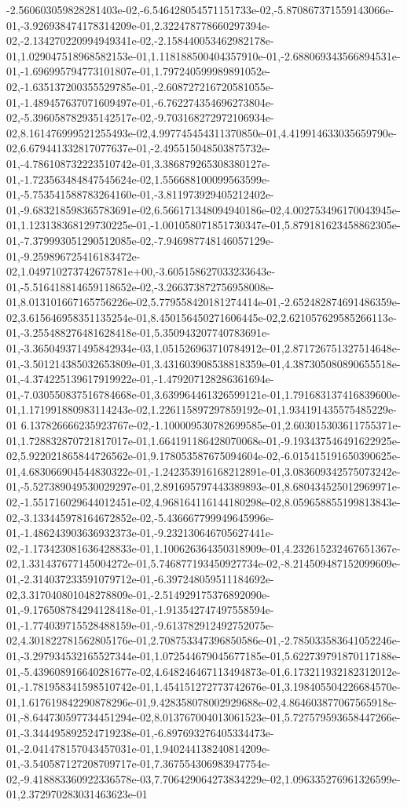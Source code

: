 -2.560603059828281403e-02,-6.546428054571151733e-02,-5.870867371559143066e-01,-3.926938474178314209e-01,2.322478778660297394e-02,-2.134270220994949341e-02,-2.158440053462982178e-01,1.029047518968582153e-01,1.118188500404357910e-01,-2.688069343566894531e-01,-1.696995794773101807e-01,1.797240599989891052e-02,-1.635137200355529785e-01,-2.608727216720581055e-01,-1.489457637071609497e-01,-6.762274354696273804e-02,-5.396058782935142517e-02,-9.703168272972106934e-02,8.161476999521255493e-02,4.997745454311370850e-01,4.419914633035659790e-02,6.679441332817077637e-01,-2.495515048503875732e-01,-4.786108732223510742e-01,3.386879265308380127e-01,-1.723563484847545624e-02,1.556688100099563599e-01,-5.753541588783264160e-01,-3.811973929405212402e-01,-9.683218598365783691e-02,6.566171348094940186e-02,4.002753496170043945e-01,1.123138368129730225e-01,-1.001058071851730347e-01,5.879181623458862305e-01,-7.379993051290512085e-02,-7.946987748146057129e-01,-9.259896725416183472e-02,1.049710273742675781e+00,-3.605158627033233643e-01,-5.516418814659118652e-02,-3.266373872756958008e-01,8.013101667165756226e-02,5.779558420181274414e-01,-2.652482874691486359e-02,3.615646958351135254e-01,8.450156450271606445e-02,2.621057629585266113e-01,-3.255488276481628418e-01,5.350943207740783691e-01,-3.365049371495842934e-03,1.051526963710784912e-01,2.871726751327514648e-01,-3.501214385032653809e-01,3.431603908538818359e-01,4.387305080890655518e-01,-4.374225139617919922e-01,-1.479207128286361694e-01,-7.030550837516784668e-01,3.639964461326599121e-01,1.791683137416839600e-01,1.171991880983114243e-02,1.226115897297859192e-01,1.934191435575485229e-01
6.137826666235923767e-02,-1.100009530782699585e-01,2.603015303611755371e-01,1.728832870721817017e-01,1.664191186428070068e-01,-9.193437546491622925e-02,5.922021865844726562e-01,9.178053587675094604e-02,-6.015415191650390625e-01,4.683066904544830322e-01,-1.242353916168212891e-01,3.083609342575073242e-01,-5.527389049530029297e-01,2.891695797443389893e-01,8.680434525012969971e-02,-1.551716029644012451e-02,4.968164116144180298e-02,8.059658855199813843e-02,-3.133445978164672852e-02,-5.436667799949645996e-01,-1.486243903636932373e-01,-9.232130646705627441e-02,-1.173423081636428833e-01,1.100626364350318909e-01,4.232615232467651367e-02,1.331437677145004272e-01,5.746877193450927734e-02,-8.214509487152099609e-01,-2.314037233591079712e-01,-6.397248059511184692e-02,3.317040801048278809e-01,-2.514929175376892090e-01,-9.176508784294128418e-01,-1.913542747497558594e-01,-1.774039715528488159e-01,-9.613782912492752075e-02,4.301822781562805176e-01,2.708753347396850586e-01,-2.785033583641052246e-01,-3.297934532165527344e-01,1.072544679045677185e-01,5.622739791870117188e-01,-5.439608916640281677e-02,4.648246467113494873e-01,6.173211932182312012e-01,-1.781958341598510742e-01,1.454151272773742676e-01,3.198405504226684570e-01,1.617619842290878296e-01,9.428358078002929688e-02,4.864603877067565918e-01,-8.644730597734451294e-02,8.013767004013061523e-01,5.727579593658447266e-01,-3.344495892524719238e-01,-6.897693276405334473e-01,-2.041478157043457031e-01,1.940244138240814209e-01,-3.540587127208709717e-01,7.367554306983947754e-02,-9.418883360922336578e-03,7.706429064273834229e-02,1.096335276961326599e-01,2.372970283031463623e-01
